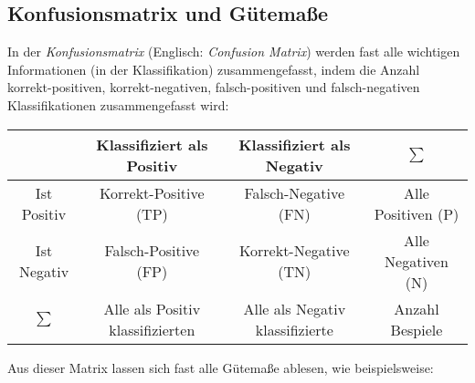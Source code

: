 		\subsection{Konfusionsmatrix und Gütemaße}
			In der \emph{Konfusionsmatrix} (Englisch: \emph{Confusion Matrix}) werden fast alle wichtigen Informationen (in der Klassifikation) zusammengefasst, indem die Anzahl korrekt-positiven, korrekt-negativen, falsch-positiven und falsch-negativen Klassifikationen zusammengefasst wird:
			\begin{center}
				\begin{tabular}{c|c|c|c}
					            &    Klassifiziert als Positiv     &    Klassifiziert als Negativ    &      \(\sum\)      \\ \hline
					Ist Positiv &      Korrekt-Positive (TP)       &      Falsch-Negative (FN)       & Alle Positiven (P) \\ \hline
					Ist Negativ &       Falsch-Positive (FP)       &      Korrekt-Negative (TN)      & Alle Negativen (N) \\ \hline
					 \(\sum\)   & Alle als Positiv klassifizierten & Alle als Negativ klassifizierte &  Anzahl Bespiele
				\end{tabular}
			\end{center}
			Aus dieser Matrix lassen sich fast alle Gütemaße ablesen, wie beispielsweise:
